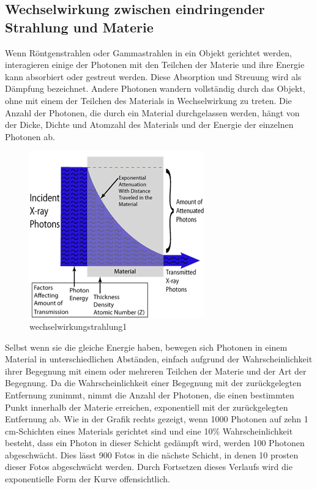 {{\subsection{Wechselwirkung zwischen eindringender Strahlung
und Materie}
Wenn Röntgenstrahlen oder Gammastrahlen in ein Objekt gerichtet werden, interagieren einige der Photonen mit den Teilchen der Materie und ihre Energie kann absorbiert oder gestreut werden. Diese Absorption und Streuung wird als Dämpfung bezeichnet. Andere Photonen wandern vollständig durch das Objekt, ohne mit einem der Teilchen des Materials in Wechselwirkung zu treten. Die Anzahl der Photonen, die durch ein Material durchgelassen werden, hängt von der Dicke, Dichte und Atomzahl des Materials und der Energie der einzelnen Photonen ab.
\begin{figure}[htb]
  \centering  
  \includegraphics[scale=0.7]{img/wechselwirkungstrahlung1.png}
  \caption{wechselwirkungstrahlung1}
  \label{fig:strahlung1}
\end{figure}
Selbst wenn sie die gleiche Energie haben, bewegen sich Photonen in einem Material in unterschiedlichen Abständen, einfach aufgrund der Wahrscheinlichkeit ihrer Begegnung mit einem oder mehreren Teilchen der Materie und der Art der Begegnung.
Da die Wahrscheinlichkeit einer Begegnung mit der zurückgelegten Entfernung zunimmt, nimmt die Anzahl der Photonen, die einen bestimmten Punkt innerhalb der Materie erreichen, exponentiell mit der zurückgelegten Entfernung ab.
Wie in der Grafik rechts gezeigt, wenn 1000 Photonen auf zehn 1 cm-Schichten eines Materials gerichtet sind und eine 10\% Wahrscheinlichkeit besteht, dass ein Photon in dieser Schicht gedämpft wird, werden 100 Photonen abgeschwächt. Dies lässt 900 Fotos in die nächste Schicht, in denen 10 prosten dieser Fotos abgeschwächt werden.
Durch Fortsetzen dieses Verlaufs wird die exponentielle Form der Kurve offensichtlich.
}}

